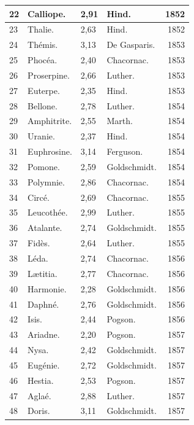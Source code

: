 \documentclass[a4paper, 11pt, oneside, landscape]{article}
\begin{document}
\begin{landscape}
\begin{center}
\begin{longtable}{|p{10mm}|l|p{10mm}|l|r|}
        22 & Calliope. & 2,91 & Hind. & 1852 \\ \hline
        23 & Thalie. & 2,63 & Hind. & 1852 \\ \hline
        24 & Thémis. & 3,13 & De Gasparis. & 1853 \\ \hline
        25 & Phocéa. & 2,40 & Chacornac. & 1853 \\ \hline
        26 & Proserpine. & 2,66 & Luther. & 1853 \\ \hline
        27 & Euterpe. & 2,35 & Hind. & 1853 \\ \hline
        28 & Bellone. & 2,78 & Luther. & 1854 \\ \hline
        29 & Amphitrite. & 2,55 & Marth. & 1854 \\ \hline
        30 & Uranie. & 2,37 & Hind. & 1854 \\ \hline
        31 & Euphrosine. & 3,14 & Ferguson. & 1854 \\ \hline
        32 & Pomone. & 2,59 & Goldschmidt. & 1854 \\ \hline
        33 & Polymnie. & 2,86 & Chacornac. & 1854 \\ \hline
        34 & Circé. & 2,69 & Chacornac. & 1855 \\ \hline
        35 & Leucothée. & 2,99 & Luther. & 1855 \\ \hline
        36 & Atalante. & 2,74 & Goldschmidt. & 1855 \\ \hline
        37 & Fidès. & 2,64 & Luther. & 1855 \\ \hline
        38 & Léda. & 2,74 & Chacornac. & 1856 \\ \hline
        39 & Lætitia. & 2,77 & Chacornac. & 1856 \\ \hline
        40 & Harmonie. & 2,28 & Goldschmidt. & 1856 \\ \hline
        41 & Daphné. & 2,76 & Goldschmidt. & 1856 \\ \hline
        42 & Isis. & 2,44 & Pogson. & 1856 \\ \hline
        43 & Ariadne. & 2,20 & Pogson. & 1857 \\ \hline
        44 & Nysa. & 2,42 & Goldschmidt. & 1857 \\ \hline
        45 & Eugénie. & 2,72 & Goldschmidt. & 1857 \\ \hline
        46 & Hestia. & 2,53 & Pogson. & 1857 \\ \hline
        47 & Aglaé. & 2,88 & Luther. & 1857 \\ \hline
        48 & Doris. & 3,11 & Goldschmidt. & 1857 \\ \hline

\end{longtable}
\end{center}
\end{landscape}
\end{document}

